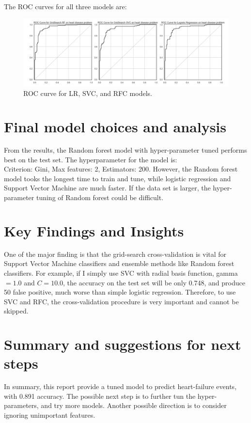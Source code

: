 \documentclass[11pt]{article}
\begin{document}
The ROC curves for all three models are:

\begin{figure}[h!]
\centerline{\includegraphics[scale=0.6]{cls_fi.pdf}}
\caption{ROC curve for LR, SVC, and RFC models.}
\end{figure}

\section{Final model choices and analysis}\label{section-pred}
From the results, the Random forest model with hyper-parameter tuned performs best on the test set.
The hyperparameter for the model is: \\
Criterion: Gini, Max features: 2, Estimators: 200.
However, the Random forest model tooks the longest time to train and tune, while logistic regression and Support Vector Machine are much faster.
If the data set is larger, the hyper-parameter tuning of Random forest could be difficult.

\section{Key Findings and Insights}\label{section-find}
One of the major finding is that the grid-search cross-validation is vital for Support Vector Machine classifiers and ensemble methods like Random forest classifiers.
For example, if I simply use SVC with radial basis function, gamma$=1.0$ and $C=10.0$, the accuracy on the test set will be only 0.748, and produce 50 false positive, much worse than simple logistic regression.
Therefore, to use SVC and RFC, the cross-validation procedure is very important and cannot be skipped.

\section{Summary and suggestions for next steps}\label{section-sugg}
In summary, this report provide a tuned model to predict heart-failure events, with 0.891 accuracy.
The possible next step is to further tun the hyper-parameters, and try more models.
Another possible direction is to consider ignoring unimportant features.

%
\end{document}
